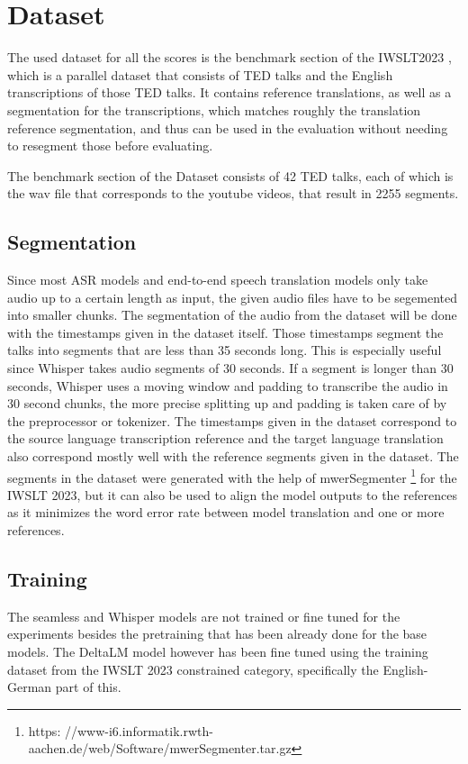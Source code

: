 \section{Dataset}
\label{ch:Dataset}
The used dataset for all the scores is the benchmark section of the IWSLT2023 \cite{sperber2024evaluating}, which is a parallel dataset that consists of TED talks and the English transcriptions of those TED talks. It contains reference translations, as well as a segmentation for the transcriptions, which matches roughly the translation reference segmentation, and thus can be used in the evaluation without needing to resegment those before evaluating.

The benchmark section of the Dataset consists of 42 TED talks, each of which is the wav file that corresponds to the youtube videos, that result in 2255 segments. 

\subsection{Segmentation}
\label{sec:FirstContent:Segmentation}
Since most ASR models and end-to-end speech translation models only take audio up to a certain length as input, the given audio files have to be segemented into smaller chunks. 
The segmentation of the audio from the dataset will be done with the timestamps given in the dataset itself. 
Those timestamps segment the talks into segments that are less than 35 seconds long.
This is especially useful since Whisper takes audio segments of 30 seconds. 
If a segment is longer than 30 seconds, Whisper uses a moving window and padding to transcribe the audio in 30 second chunks, the more precise splitting up and padding is taken care of by the preprocessor or tokenizer.
The timestamps given in the dataset correspond to the source language transcription reference and the target language translation also correspond mostly well with the reference segments given in the dataset. 
The segments in the dataset were generated with the help of mwerSegmenter \footnote{https:
//www-i6.informatik.rwth-aachen.de/web/Software/mwerSegmenter.tar.gz} for the IWSLT 2023, but it can also be used to align the model outputs to the references as it minimizes the word error rate between model translation and one or more references.

\subsection{Training}
The seamless and Whisper models are not trained or fine tuned for the experiments besides the pretraining that has been already done for the base models. 
The DeltaLM model however has been fine tuned using the training dataset from the IWSLT 2023 constrained category, specifically the English-German part of this. 
